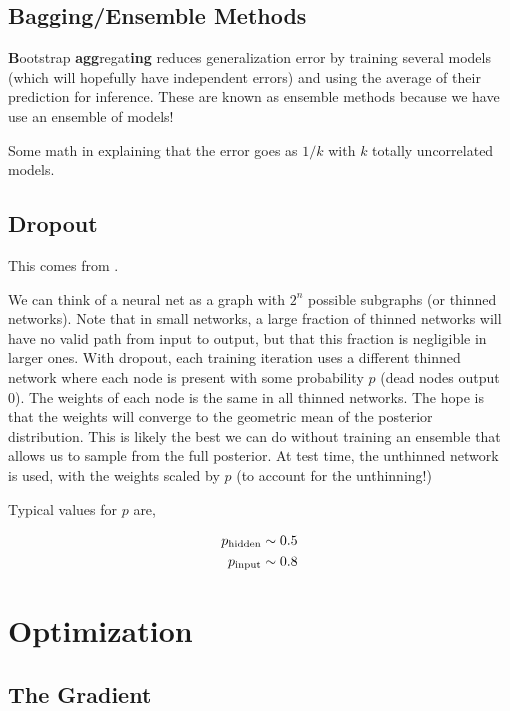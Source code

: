 \documentclass{article}
\begin{document}
\subsection{Bagging/Ensemble Methods}

{\bf B}ootstrap {\bf agg}regat{\bf ing} reduces generalization error by training several models (which will hopefully have independent errors) and using the average of their prediction for inference. These are known as ensemble methods because we have use an ensemble of models!

Some math in \citet[pg. 249]{Goodfellow2016} explaining that the error goes as $1/k$ with $k$ totally uncorrelated models.

\subsection{Dropout}

This comes from \citet{Srivastava2014}.

We can think of a neural net as a graph with $2^n$ possible subgraphs (or thinned networks).
Note that in small networks, a large fraction of thinned networks will have no valid path from input to output, but that this fraction is negligible in larger ones.
With dropout, each training iteration uses a different thinned network where each node is present with some probability $p$ (dead nodes output 0).
The weights of each node is the same in all thinned networks.
The hope is that the weights will converge to the geometric mean of the posterior distribution. This is likely the best we can do without training an ensemble that allows us to sample from the full posterior.
At test time, the unthinned network is used, with the weights scaled by $p$ (to account for the unthinning!)

Typical values for $p$ are,

\begin{align}
    p_{\rm hidden} &\sim 0.5 \\
    p_{\rm input} &\sim 0.8
\end{align}


\section{Optimization}

\subsection{The Gradient}
\end{document}
